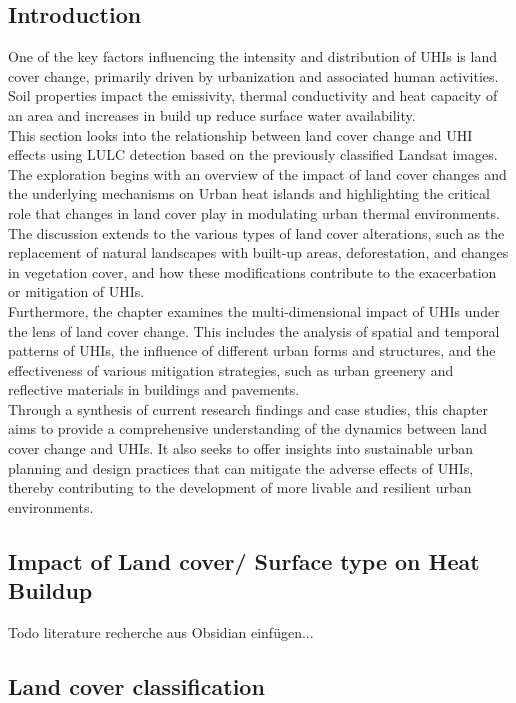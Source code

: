 \documentclass[12pt,a4paper, english]{article}
\begin{document}
    \subsection{Introduction}
  One of the key factors influencing the intensity and distribution of UHIs is land cover change, primarily driven by urbanization and associated human activities.
    Soil properties impact the emissivity, thermal conductivity and heat capacity of an area and increases in build up reduce surface water availability. 
\\    
This section looks into the relationship between land cover change and UHI effects using LULC detection based on the previously classified Landsat images.
The exploration begins with an overview of the impact of land cover changes and the underlying mechanisms on Urban heat islands and highlighting the critical role that changes in land cover play in modulating urban thermal environments.
The discussion extends to the various types of land cover alterations, such as the replacement of natural landscapes with built-up areas, deforestation, and changes in vegetation cover, and how these modifications contribute to the exacerbation or mitigation of UHIs.
\\
Furthermore, the chapter examines the multi-dimensional impact of UHIs under the lens of land cover change.
This includes the analysis of spatial and temporal patterns of UHIs, the influence of different urban forms and structures, and the effectiveness of various mitigation strategies, such as urban greenery and reflective materials in buildings and pavements.
\\
Through a synthesis of current research findings and case studies, this chapter aims to provide a comprehensive understanding of the dynamics between land cover change and UHIs.
It also seeks to offer insights into sustainable urban planning and design practices that can mitigate the adverse effects of UHIs, thereby contributing to the development of more livable and resilient urban environments.
%
    \subsection{Impact of Land cover/ Surface type on Heat Buildup}
    Todo literature recherche aus Obsidian einfügen... 
    \subsection{Land cover classification}
\end{document}
